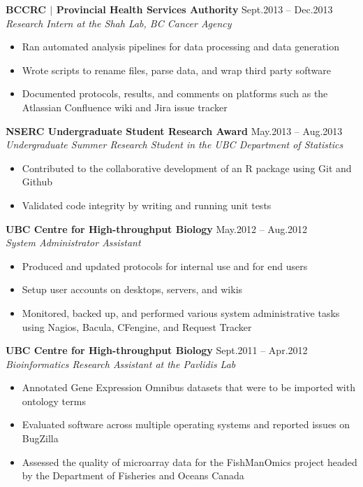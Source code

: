 \documentclass{res}
\newcommand{\linehead}[2]{%
  {\bf #1} \hfill #2\\}
\newcommand{\linetitle}[1]{%
  {\sl #1}}
\begin{document}
\begin{resume}
\linehead{BCCRC $|$ Provincial Health Services Authority}{Sept.2013 -- Dec.2013}
\linetitle{Research Intern at the Shah Lab, BC Cancer Agency}
\begin{itemize}
  \item Ran automated analysis pipelines for data processing and data generation
  \item Wrote scripts to rename files, parse data, and wrap third party software
  \item Documented protocols, results, and comments on platforms such as the Atlassian Confluence wiki and Jira issue tracker
\end{itemize}

\linehead{NSERC Undergraduate Student Research Award}{May.2013 -- Aug.2013}
\linetitle{Undergraduate Summer Research Student in the UBC Department of Statistics}
\begin{itemize}
  \item Contributed to the collaborative development of an R package using Git and Github
  \item Validated code integrity by writing and running unit tests
\end{itemize}

\linehead{UBC Centre for High-throughput Biology}{May.2012 -- Aug.2012}
\linetitle{System Administrator Assistant}
\begin{itemize}
  \item Produced and updated protocols for internal use and for end users
  \item Setup user accounts on desktops, servers, and wikis
  \item Monitored, backed up, and performed various system administrative tasks using Nagios, Bacula, CFengine, and Request Tracker
\end{itemize}

\linehead{UBC Centre for High-throughput Biology}{Sept.2011 -- Apr.2012}
\linetitle{Bioinformatics Research Assistant at the Pavlidis Lab}
\begin{itemize}
  \item Annotated Gene Expression Omnibus datasets that were to be imported with ontology terms
  \item Evaluated software across multiple operating systems and reported issues on BugZilla
  \item Assessed the quality of microarray data for the FishManOmics project headed by the Department of Fisheries and Oceans Canada
\end{itemize}


\end{resume}
\end{document}
